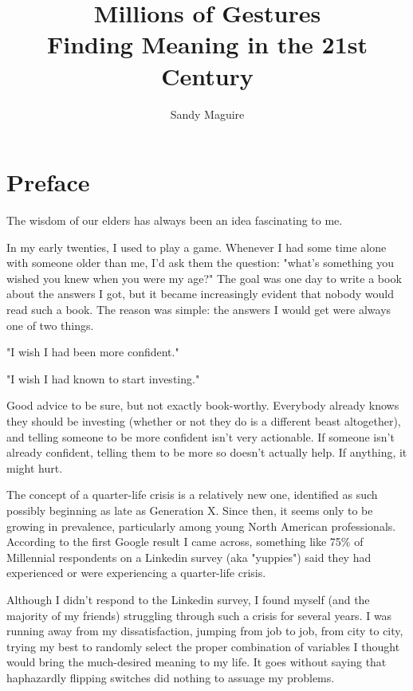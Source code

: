 \documentclass[]{book}
\title{\textbf{\LARGE Millions of Gestures}\\
       {\Large{Finding Meaning in the 21st Century}}}
\author{Sandy Maguire}
\date{}
\begin{document}
\frontmatter
\maketitle

\tableofcontents

\linenumbers

\chapter*{Preface}

The wisdom of our elders has always been an idea fascinating to me.

In my early twenties, I used to play a game. Whenever I had some time alone with
someone older than me, I'd ask them the question: "what's something you wished
you knew when you were my age?" The goal was one day to write a book about the
answers I got, but it became increasingly evident that nobody would read such a
book. The reason was simple: the answers I would get were always one of two
things.

"I wish I had been more confident."

"I wish I had known to start investing."

Good advice to be sure, but not exactly book-worthy. Everybody already knows
they should be investing (whether or not they do is a different beast
altogether), and telling someone to be more confident isn't very actionable. If
someone isn't already confident, telling them to be more so doesn't actually
help. If anything, it might hurt.

The concept of a quarter-life crisis is a relatively new one, identified as such
possibly beginning as late as Generation X. Since then, it seems only to be
growing in prevalence, particularly among young North American professionals.
According to the first Google result I came across, something like 75\% of
Millennial respondents on a Linkedin survey (aka "yuppies") said they had
experienced or were experiencing a quarter-life crisis.

Although I didn't respond to the Linkedin survey, I found myself (and the
majority of my friends) struggling through such a crisis for several years. I
was running away from my dissatisfaction, jumping from job to job, from city to
city, trying my best to randomly select the proper combination of variables I
thought would bring the much-desired meaning to my life. It goes without saying
that haphazardly flipping switches did nothing to assuage my problems.
\end{document}
